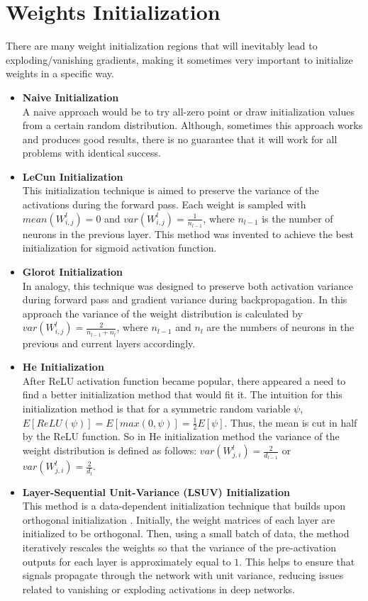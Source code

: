 \section{Weights Initialization}
There are many weight initialization regions that will inevitably lead to exploding/vanishing gradients, making it sometimes very important to initialize weights in a specific way. \autocite{sun2020optimization}
\begin{itemize}
  \item \textbf{Naive Initialization} \\
    A naive approach would be to try all-zero point or draw initialization values from a certain random distribution. Although, sometimes this approach works and produces good results, there is no guarantee that it will work for all problems with identical success.
  \item \textbf{LeCun Initialization} \autocite{LeCun1998} \\
    This initialization technique is aimed to preserve the variance of the activations during the forward pass. Each weight is sampled with $mean(W_{i,j}^l) = 0$ and $var(W_{i,j}^l) = \frac{1}{n_{l-1}}$, where $n_{l-1}$ is the number of neurons in the previous layer. This method was invented to achieve the best initialization for sigmoid activation function.
  \item \textbf{Glorot Initialization} \autocite{glorot2010understanding} \\
    In analogy, this technique was designed to preserve both activation variance during forward pass and gradient variance during backpropagation. In this approach the variance of the weight distribution is calculated by $var(W_{i,j}^l) = \frac{2}{n_{l-1} + n_{l}}$, where $n_{l-1}$ and $n_{l}$ are the numbers of neurons in the previous and current layers accordingly.
  \item \textbf{He Initialization} \autocite{he2015delving} \\
    After ReLU activation function became popular, there appeared a need to find a better initialization method that would fit it. The intuition for this initialization method is that for a symmetric random variable $\psi$, $ E[ReLU(\psi)] = E[max(0, \psi)] = \frac{1}{2} E[\psi] $. Thus, the mean is cut in half by the ReLU function. So in He initialization method the variance of the weight distribution is defined as follows: $var(W_{j,i}^l) = \frac{2}{d_{l-1}}$ or $var(W_{j,i}^l) = \frac{2}{d_l}$.
  \item \textbf{Layer-Sequential Unit-Variance (LSUV) Initialization} \autocite{mishkin2015all} \\
    This method is a data-dependent initialization technique that builds upon orthogonal initialization \autocite{saxe2013exact}. Initially, the weight matrices of each layer are initialized to be orthogonal. Then, using a small batch of data, the method iteratively rescales the weights so that the variance of the pre-activation outputs for each layer is approximately equal to $1$. This helps to ensure that signals propagate through the network with unit variance, reducing issues related to vanishing or exploding activations in deep networks.
\end{itemize}

